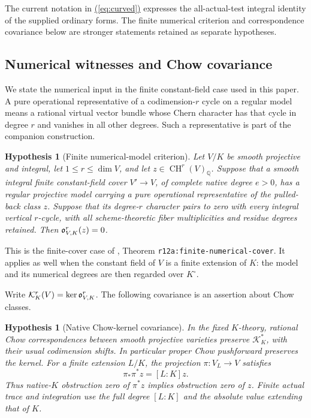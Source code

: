 \documentclass[11pt,a4paper]{article}
\newtheorem{hypothesis}[theorem]{Hypothesis}
\theoremstyle{definition}
\theoremstyle{remark}\newtheorem{remark}[theorem]{Remark}
\numberwithin{equation}{section}
\newcommand{\Q}{\mathbb Q}\newcommand{\R}{\mathbb R}\newcommand{\C}{\mathbb C}
\newcommand{\CH}{\operatorname{CH}}\newcommand{\an}{\mathrm{an}}
\renewcommand{\eqref}[1]{\hyperref[#1]{\textcolor{equationlink}{(\ref*{#1})}}}
\begin{document}
The current notation in \eqref{eq:curved} expresses the all-actual-test
integral identity of the supplied ordinary forms. The finite numerical
criterion and correspondence covariance below are stronger statements
retained as separate hypotheses.

\subsection{Numerical witnesses and Chow covariance}\label{sub:covariance}

We state the numerical input in the finite constant-field case used in
this paper. A pure operational representative of a codimension-$r$
cycle on a regular model means a rational virtual vector bundle whose
Chern character has that cycle in degree $r$ and vanishes in all other
degrees. Such a representative is part of the companion construction.

\begin{hypothesis}[Finite numerical-model criterion]\label{prop:numerical}
Let $V/K$ be smooth projective and integral, let $1\le r\le\dim V$,
and let $z\in\CH^r(V)_\Q$. Suppose that a smooth integral finite
constant-field cover $V'\to V$, of complete native degree $e>0$, has a
regular projective model carrying a pure operational representative of
the pulled-back class $z$. Suppose that its degree-$r$ character pairs
to zero with every integral vertical $r$-cycle, with all
scheme-theoretic fiber multiplicities and residue degrees retained.
Then $\mathfrak o^r_{V,K}(z)=0$.
\end{hypothesis}

This is the finite-cover case of \cite{InternalNumerical}, Theorem
\texttt{r12a:finite-numerical-cover}. It applies as well when the
constant field of $V$ is a finite extension of $K$: the model and its
numerical degrees are then regarded over $K^\circ$.

Write $\mathcal K_K^r(V)=\ker\mathfrak o^r_{V,K}$. The following covariance
is an assertion about Chow classes.

\begin{hypothesis}[Native Chow-kernel covariance]\label{prop:covariance}
In the fixed $K$-theory, rational Chow correspondences between smooth
projective varieties preserve $\mathcal K_K^*$, with their usual
codimension shifts. In particular proper Chow pushforward preserves
the kernel. For a finite extension $L/K$, the projection
$\pi:V_L\to V$ satisfies
\[
          \pi_*\pi^*z=[L:K]z.
\]
Thus native-$K$ obstruction zero of $\pi^*z$ implies obstruction zero
of $z$. Finite actual trace and integration use the full degree
$[L:K]$ and the absolute value extending that of $K$.
\end{hypothesis}
\end{document}
